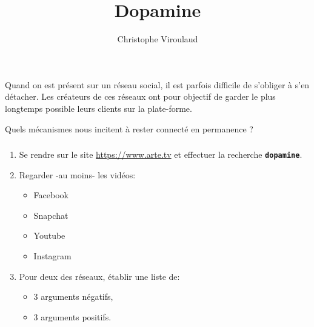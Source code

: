 \documentclass[svgnames,11pt]{beamer}
\author[]{Christophe Viroulaud}
\title{Dopamine}
\date{\framebox{\textbf{ResSoc 02}}}
\institute{Seconde - SNT}
\begin{document}
\begin{frame}
\titlepage
\end{frame}
\begin{frame}
    \frametitle{}

    Quand on est présent sur un réseau social, il est parfois difficile de s’obliger à s’en détacher. Les
créateurs de ces réseaux ont pour objectif de garder le plus longtemps possible leurs clients sur la
plate-forme.
\begin{framed}
    \centering Quels mécanismes nous incitent à rester connecté en permanence ?
\end{framed}

\end{frame}
\begin{frame}
    \frametitle{}

    \begin{activite}
    \begin{enumerate}
        \item Se rendre sur le site \url{https://www.arte.tv} et effectuer la recherche \textbf{\texttt{dopamine}}.
        \item Regarder -au moins- les vidéos:
        \begin{itemize}
            \item Facebook
            \item Snapchat
            \item Youtube
            \item Instagram
        \end{itemize}
        \item Pour deux des réseaux, établir une liste de:
        \begin{itemize}
            \item 3 arguments négatifs,
            \item 3 arguments positifs.
        \end{itemize}
    \end{enumerate}
    \end{activite}

\end{frame}
\end{document}
